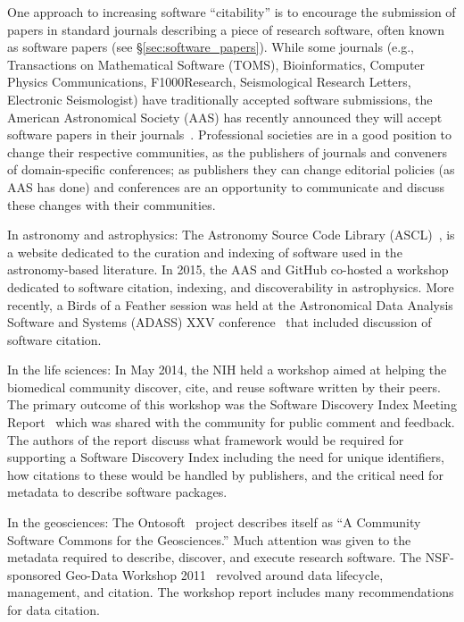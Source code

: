 \documentclass[12pt, oneside]{amsart}
\begin{document}
One approach to increasing software ``citability'' is to encourage the
submission of papers in standard journals describing a piece of research
software, often known as software papers (see \S\ref{sec:software_papers}).
While some journals (e.g., Transactions on Mathematical Software (TOMS),
Bioinformatics, Computer Physics Communications, F1000Research,
Seismological Research Letters, Electronic Seismologist) have
traditionally accepted software submissions, the American Astronomical Society
(AAS) has recently announced they will accept software papers in their
journals~\cite{aas-sofware-papers}. Professional societies are in a good
position to change their respective communities, as the publishers of journals
and conveners of domain-specific conferences; as publishers they can change
editorial policies (as AAS has done) and conferences are an opportunity to
communicate and discuss these changes with their communities.

In astronomy and astrophysics: The Astronomy Source Code Library
(ASCL)~\cite{ascl}, is a website dedicated to the curation and indexing of
software used in the astronomy-based literature. In 2015, the AAS and GitHub
co-hosted a workshop~\cite{aas-software-index} dedicated to software citation,
indexing, and discoverability in astrophysics. More recently, a Birds of a Feather session was
held at the Astronomical Data Analysis Software and Systems (ADASS) XXV
conference~\cite{Allen:2015ub} that included discussion of software
citation.

In the life sciences: In May 2014, the NIH held a workshop aimed at helping the
biomedical community discover, cite, and reuse software written by their peers.
The primary outcome of this workshop was the Software Discovery Index Meeting
Report~\cite{software-discovery-index} which was shared with the community for
public comment and feedback. The authors of the report discuss
what framework would be required for supporting a Software Discovery Index
including the need for unique identifiers, how citations to these would be
handled by publishers, and the critical need for metadata to describe software
packages.

In the geosciences: The Ontosoft~\cite{ontosoft} project describes itself as ``A
Community Software Commons for the Geosciences.'' Much attention was given to the
metadata required to describe, discover, and execute research software. The NSF-sponsored
Geo-Data Workshop 2011~\cite{nsf-geo-data} revolved around data lifecycle, management, and
citation. The workshop report includes many recommendations for data
citation.
\end{document}
